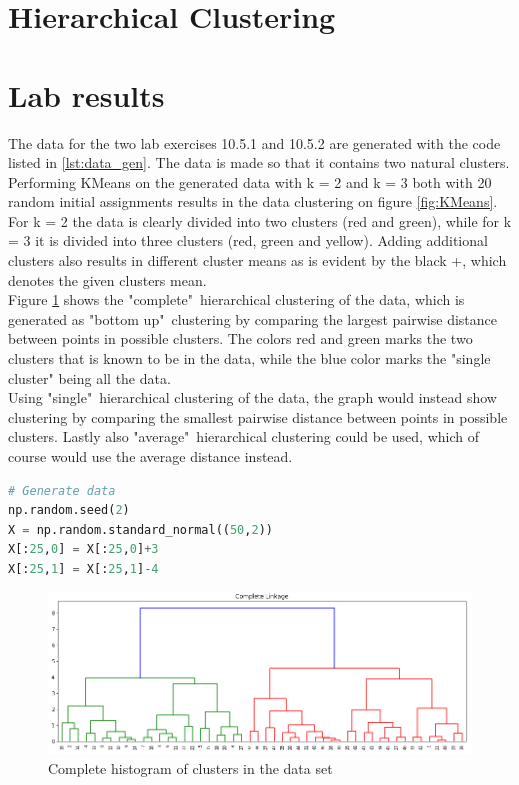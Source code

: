 \section{Hierarchical Clustering}


\section{Lab results}

The data for the two lab exercises 10.5.1 and 10.5.2 are generated with the code listed in \ref{lst:data_gen}. The data is made so that it contains two natural clusters.\\ 
Performing KMeans on the generated data with k = 2 and k = 3 both with 20 random initial assignments results in the data clustering on figure \ref{fig:KMeans}. For k = 2 the data is clearly divided into two clusters (red and green), while for k = 3 it is divided into three clusters (red, green and yellow). Adding additional clusters also results in different cluster means as is evident by the black +, which denotes the given clusters mean.\\
Figure \ref{fig:HC_Complete} shows the "complete"\ hierarchical clustering of the data, which is generated as "bottom up"\ clustering by comparing the largest pairwise distance between points in possible clusters. The colors red and green marks the two clusters that is known to be in the data, while the blue color marks the "single cluster" being all the data.\\ 
Using "single"\ hierarchical clustering of the data, the graph would instead show clustering by comparing the smallest pairwise distance between points in possible clusters. Lastly also "average"\ hierarchical clustering could be used, which of course would use the average distance instead.


\begin{lstlisting}[language=Python, caption=Code for generating the data]
# Generate data
np.random.seed(2)
X = np.random.standard_normal((50,2))
X[:25,0] = X[:25,0]+3
X[:25,1] = X[:25,1]-4
\end{lstlisting}\label{lst:data_gen}


\begin{figure}[H]
	\centering
	\includegraphics[width=14cm]{Img/HC_Complete.PNG}
	\caption{Complete histogram of clusters in the data set}
	\label{fig:HC_Complete}
\end{figure}

